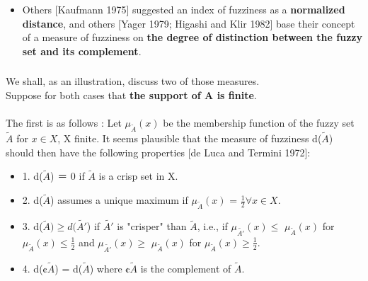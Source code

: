 \documentclass{beamer}
\begin{document}
\begin{CJK*}{UTF8}{bsmi}
\begin{frame}
\begin{itemize}
\item Others [Kaufmann 1975] suggested an index of fuzziness as a \textbf{normalized distance}, and others [Yager 1979; Higashi and Klir 1982] base their concept of a measure of fuzziness on \textbf{the degree of distinction between the fuzzy set and its complement}.

\end{itemize}

\end{frame}



\begin{frame}
\frametitle{}
We shall, as an illustration, discuss two of those measures.\\
Suppose for both cases that \textbf{the support of A is finite}.\\
~\\
The first is as follows : Let $\mu_{\tilde{A}}(x)$ be the membership function of the fuzzy set $\tilde{A}$ for $x \in X$, X finite. It seems plausible that the measure of fuzziness d($\tilde{A}$) should then have the following properties [de Luca and Termini 1972]:\\
\begin{block}{}
\begin{itemize}
\item1. d($\tilde{A}$) ＝ 0 if $\tilde{A}$ is a crisp set in X.
\item2. d($\tilde{A}$) assumes a unique maximum if $\mu_{\tilde{A}}(x)$ = $ \frac{1}{2} \forall x \in X$.
\item3. d($\tilde{A}) \geq  d(\tilde{A'}$) if $\tilde{A'}$ is "crisper" than $\tilde{A}$, i.e., if $\mu_{\tilde{A'}}(x) \leq$ $\mu_{\tilde{A}}(x)$ for $\mu_{\tilde{A}}(x) \leq \frac{1}{2}$ and  $\mu_{\tilde{A'}}(x) \geq$ $\mu_{\tilde{A}}(x)$ for $\mu_{\tilde{A}}(x) \geq \frac{1}{2}$. 
\item4. d(¢$\tilde{A}$) = d($\tilde{A}$) where ¢$\tilde{A}$ is the complement of $\tilde{A}$.
\end{itemize}
\end{block}
\end{frame}



\end{CJK*}
\end{document}
